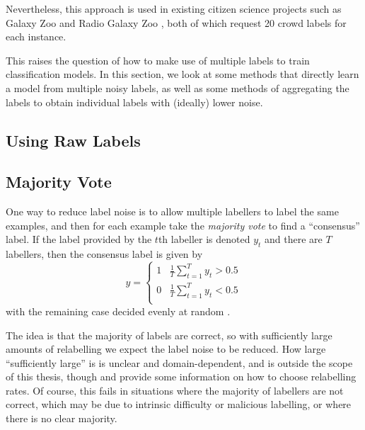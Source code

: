     Nevertheless, this approach is used in existing citizen science projects
    such as Galaxy Zoo \citep{lintott08} and Radio Galaxy Zoo
    \citep{banfield15}, both of which request 20 crowd labels for each instance.

    This raises the question of how to make use of multiple labels to train
    classification models. In this section, we look at some methods that
    directly learn a model from multiple noisy labels, as well as some methods
    of aggregating the labels to obtain individual labels with (ideally) lower
    noise.

    \subsection{Using Raw Labels}
    \label{sec:raw-labels}


    \subsection{Majority Vote}
    \label{sec:majority-vote}

        One way to reduce label noise is to allow multiple labellers to label
        the same examples, and then for each example take the \emph{majority
        vote} to find a ``consensus'' label. If the label provided by the $t$th
        labeller is denoted $y_t$ and there are $T$ labellers, then the
        consensus label is given by
        \begin{equation*}
            y = \begin{cases}
                1 & \frac{1}{T} \sum_{t = 1}^T y_t > 0.5\\
                0 & \frac{1}{T} \sum_{t = 1}^T y_t < 0.5\\
            \end{cases}
        \end{equation*}
        with the remaining case decided evenly at random \citep{raykar10}.

        The idea is that the majority of labels are correct, so with
        sufficiently large amounts of relabelling we expect the label noise to
        be reduced. How large ``sufficiently large'' is is unclear and
        domain-dependent, and is outside the scope of this thesis, though
        \citet{sheng08} and \citet{lin16} provide some information on how to
        choose relabelling rates. Of course, this fails in situations where the
        majority of labellers are not correct, which may be due to intrinsic
        difficulty or malicious labelling, or where there is no clear majority.

